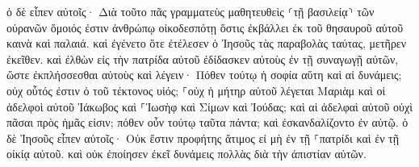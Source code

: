 \documentclass{openreader}
\begin{document}
ὁ δὲ εἶπεν αὐτοῖς· Διὰ τοῦτο πᾶς γραμματεὺς μαθητευθεὶς ⸂τῇ βασιλείᾳ⸃ τῶν οὐρανῶν ὅμοιός ἐστιν ἀνθρώπῳ οἰκοδεσπότῃ ὅστις ἐκβάλλει ἐκ τοῦ θησαυροῦ αὐτοῦ καινὰ καὶ παλαιά. 
καὶ ἐγένετο ὅτε ἐτέλεσεν ὁ Ἰησοῦς τὰς παραβολὰς ταύτας, μετῆρεν ἐκεῖθεν. 
καὶ ἐλθὼν εἰς τὴν πατρίδα αὐτοῦ ἐδίδασκεν αὐτοὺς ἐν τῇ συναγωγῇ αὐτῶν, ὥστε ἐκπλήσσεσθαι αὐτοὺς καὶ λέγειν· Πόθεν τούτῳ ἡ σοφία αὕτη καὶ αἱ δυνάμεις; 
οὐχ οὗτός ἐστιν ὁ τοῦ τέκτονος υἱός; ⸀οὐχ ἡ μήτηρ αὐτοῦ λέγεται Μαριὰμ καὶ οἱ ἀδελφοὶ αὐτοῦ Ἰάκωβος καὶ ⸀Ἰωσὴφ καὶ Σίμων καὶ Ἰούδας; 
καὶ αἱ ἀδελφαὶ αὐτοῦ οὐχὶ πᾶσαι πρὸς ἡμᾶς εἰσιν; πόθεν οὖν τούτῳ ταῦτα πάντα; 
καὶ ἐσκανδαλίζοντο ἐν αὐτῷ. ὁ δὲ Ἰησοῦς εἶπεν αὐτοῖς· Οὐκ ἔστιν προφήτης ἄτιμος εἰ μὴ ἐν τῇ ⸀πατρίδι καὶ ἐν τῇ οἰκίᾳ αὐτοῦ. 
καὶ οὐκ ἐποίησεν ἐκεῖ δυνάμεις πολλὰς διὰ τὴν ἀπιστίαν αὐτῶν. 
\end{document}
